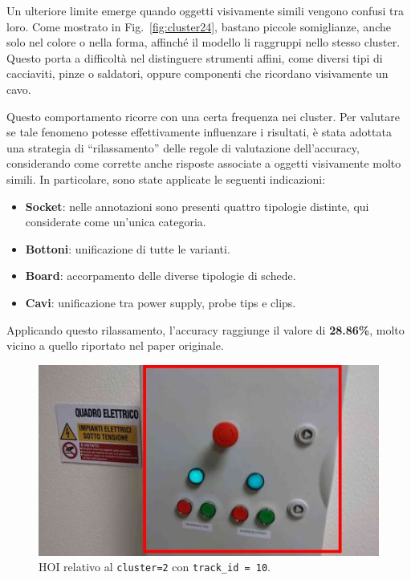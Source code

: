 Un ulteriore limite emerge quando oggetti visivamente simili vengono confusi tra loro. Come mostrato in Fig.~\ref{fig:cluster24}, bastano piccole somiglianze, anche solo nel colore o nella forma, affinché il modello li raggruppi nello stesso cluster. Questo porta a difficoltà nel distinguere strumenti affini, come diversi tipi di cacciaviti, pinze o saldatori, oppure componenti che ricordano visivamente un cavo.

Questo comportamento ricorre con una certa frequenza nei cluster. Per valutare se tale fenomeno potesse effettivamente influenzare i risultati, è stata adottata una strategia di “rilassamento” delle regole di valutazione dell'accuracy, considerando come corrette anche risposte associate a oggetti visivamente molto simili. In particolare, sono state applicate le seguenti indicazioni:
\begin{itemize}
    \item \textbf{Socket}: nelle annotazioni sono presenti quattro tipologie distinte, qui considerate come un'unica categoria.
    \item \textbf{Bottoni}: unificazione di tutte le varianti.
    \item \textbf{Board}: accorpamento delle diverse tipologie di schede.
    \item \textbf{Cavi}: unificazione tra power supply, probe tips e clips.
\end{itemize}

Applicando questo rilassamento, l'accuracy raggiunge il valore di \textbf{28.86\%}, molto vicino a quello riportato nel paper originale.

\begin{figure}[ht]
    \centering
    \includegraphics[width=0.5\linewidth]{Images/cluster2-10.jpg}
    \caption{HOI relativo al \texttt{cluster=2} con \texttt{track\_id = 10}.}
    \label{fig:cluster2-10}
\end{figure}

